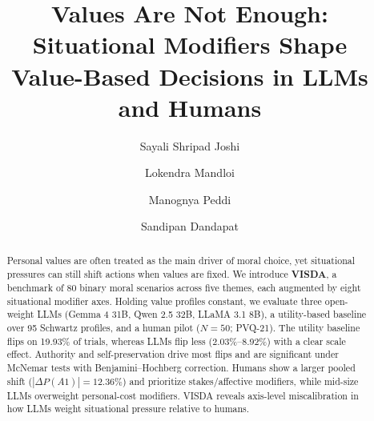 \documentclass[11pt]{article}
\title{\textbf{Values Are Not Enough: Situational Modifiers Shape\\Value-Based Decisions in LLMs and Humans}}
\author[1]{Sayali Shripad Joshi}
\author[1]{Lokendra Mandloi}
\author[1]{Manognya Peddi}
\author[1]{Sandipan Dandapat}
\affil[1]{Department of Computer Science and Engineering, IIT Hyderabad\\
\texttt{\{cs24mtech12003, cs24mtech11024, cs24mtech12020\}@iith.ac.in, sdandapat@cse.iith.ac.in}}
\date{}
\begin{document}
\maketitle

\begin{abstract}
\noindent
Personal values are often treated as the main driver of moral choice, yet situational pressures can still shift actions when values are fixed. We introduce \textbf{VISDA}, a benchmark of 80 binary moral scenarios across five themes, each augmented by eight situational modifier axes. Holding value profiles constant, we evaluate three open-weight LLMs (Gemma 4 31B, Qwen 2.5 32B, LLaMA 3.1 8B), a utility-based baseline over 95 Schwartz profiles, and a human pilot ($N=50$; PVQ-21). The utility baseline flips on 19.93\% of trials, whereas LLMs flip less (2.03\%--8.92\%) with a clear scale effect. Authority and self-preservation drive most flips and are significant under McNemar tests with Benjamini--Hochberg correction. Humans show a larger pooled shift ($|\Delta P(A1)|=12.36\%$) and prioritize stakes/affective modifiers, while mid-size LLMs overweight personal-cost modifiers. VISDA reveals axis-level miscalibration in how LLMs weight situational pressure relative to humans.
\end{abstract}
\end{document}

